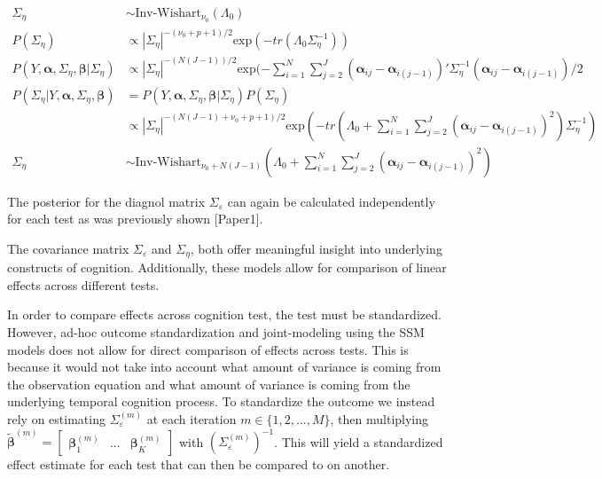 \documentclass[
]{article}
\begin{document}
\begin{equation*}
\begin{aligned}
\Sigma_\eta &\sim \text{Inv-Wishart}_{\nu_0}(\Lambda_0)\\
P(\Sigma_\eta) &\propto |\Sigma_\eta|^{-(\nu_0+p+1)/2}\text{exp}(-tr(\Lambda_0\Sigma_\eta^{-1}))\\
P(Y, \boldsymbol{\alpha}, \Sigma_\eta, \boldsymbol{\beta}|\Sigma_\eta) &\propto |\Sigma_\eta|^{-(N(J-1))/2}\text{exp}(-\sum^N_{i = 1}\sum^{J}_{j= 2} (\boldsymbol{\alpha}_{ij} - \boldsymbol{\alpha}_{i(j-1)})'\Sigma_\eta^{-1}(\boldsymbol{\alpha}_{ij} - \boldsymbol{\alpha}_{i(j-1)})/2 \\
P(\Sigma_\eta|Y, \boldsymbol{\alpha}, \Sigma_\eta, \boldsymbol{\beta}) & = P(Y, \boldsymbol{\alpha}, \Sigma_\eta, \boldsymbol{\beta}|\Sigma_\eta)P(\Sigma_\eta) \\ &\propto |\Sigma_\eta|^{-(N(J-1) +\nu_0+p+1)/2}\text{exp}(-tr(\Lambda_0 + \sum^N_{i = 1}\sum^J_{j= 2} (\boldsymbol{\alpha}_{ij} - \boldsymbol{\alpha}_{i(j-1)})^2)\Sigma_\eta^{-1})\\
\Sigma_\eta & \sim \text{Inv-Wishart}_{\nu_0 + N(J-1)}(\Lambda_0+\sum^N_{i = 1}\sum^J_{j= 2} (\boldsymbol{\alpha}_{ij} - \boldsymbol{\alpha}_{i(j-1)})^2)
\end{aligned}
\end{equation*}

The posterior for the diagnol matrix \(\Sigma_\varepsilon\) can again be calculated independently for each test as was previously shown {[}Paper1{]}.

The covariance matrix \(\Sigma_\varepsilon\) and \(\Sigma_\eta\), both offer meaningful insight into underlying constructs of cognition. Additionally, these models allow for comparison of linear effects across different tests.

In order to compare effects across cognition test, the test must be standardized. However, ad-hoc outcome standardization and joint-modeling using the SSM models does not allow for direct comparison of effects across tests. This is because it would not take into account what amount of variance is coming from the observation equation and what amount of variance is coming from the underlying temporal cognition process. To standardize the outcome we instead rely on estimating \(\Sigma_\varepsilon^{(m)}\) at each iteration \(m \in \{1, 2, ..., M\}\), then multiplying \(\tilde{\boldsymbol{\beta}}^{(m)} = \begin{bmatrix}\boldsymbol{\beta}_1^{(m)} & ... & \boldsymbol{\beta}_K^{(m)}\end{bmatrix}\) with \((\Sigma_\varepsilon^{(m)})^{-1}\). This will yield a standardized effect estimate for each test that can then be compared to on another.
\end{document}
